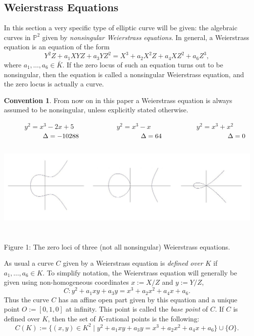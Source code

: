 \documentclass{article}
\numberwithin{equation}{section}
\theoremstyle{definition}
\newtheorem*{convention}{Convention}
\newcommand{\proj}[1]{{\mathbb P}^{#1}} %
\begin{document}
\subsection{Weierstrass Equations}\label{Weierstrassequations}
In this section a very specific type of elliptic curve will be given: the algebraic curves in $\proj{2}$ given by \emph{nonsingular Weierstrass equations}. In general, a Weierstrass equation is an equation of the form \begin{equation}\label{weierstrassequation}Y^2Z+a_1XYZ+a_3YZ^2=X^3+a_2X^2Z+a_4XZ^2+a_6Z^3,\end{equation}
where $a_1,\ldots,a_6 \in \bar{K}$. If the zero locus of such an equation turns out to be nonsingular, then the equation is called  a nonsingular Weierstrass equation, and the zero locus is actually a curve.

\begin{convention}
From now on in this paper a Weierstrass equation is always assumed to be nonsingular, unless explicitly stated otherwise.
\end{convention}

$\hspace{36pt} y^2=x^3-2x+5 \hspace{75pt} y^2=x^3-x \hspace{80pt} y^2=x^3+x^2$\\
$\hspace*{52pt} \Delta=-10288 \hspace{94pt} \Delta=64 \hspace{100pt} \Delta=0$\\
\includegraphics[width=15cm, height=5cm]{ellcurvesexamples}
\begin{center} Figure 1: The zero loci of three (not all nonsingular) Weierstrass equations. \end{center}

As usual a curve $C$ given by a Weierstrass equation is \emph{defined over $K$} if $a_1,\ldots,a_6 \in K$. To simplify notation, the Weierstrass equation will generally be given using non-homogeneous coordinates $x:=X/Z$ and $y:=Y/Z$, \begin{equation}\label{generalweierstrassequation}C:y^2+a_1xy+a_3y=x^3+a_2x^2+a_4x+a_6.\end{equation} Thus the curve $C$ has an affine open part given by this equation and a unique point $O:=[0,1,0]$ at infinity. This point is called the \emph{base point} of $C$. If $C$ is defined over $K$, then the set of $K$-rational points is the following: $$C(K):=\{(x,y)\in K^2\; | \; y^2+a_1xy+a_3y=x^3+a_2x^2+a_4x+a_6\}\cup \{O\}.$$ 
\end{document}
